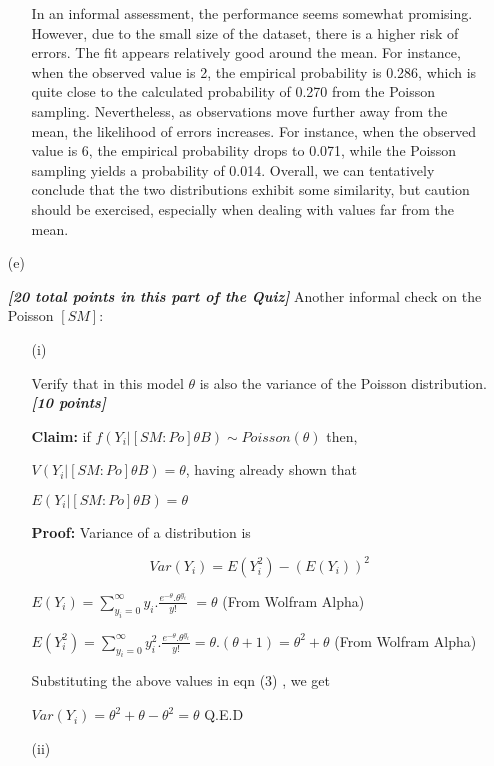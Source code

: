 \documentclass[12pt]{article}
\newcommand{\bi}[1]{\b{\i{#1}}}
\renewcommand{\b}[1]{\textbf{#1}}
\renewcommand{\i}[1]{\textit{#1}}
\begin{document}
\begin{itemize}
\begin{itemize}
{In an informal assessment, the performance seems somewhat promising. However, due to the small size of the dataset, there is a higher risk of errors. The fit appears relatively good around the mean. For instance, when the observed value is 2, the empirical probability is 0.286, which is quite close to the calculated probability of 0.270 from the Poisson sampling. Nevertheless, as observations move further away from the mean, the likelihood of errors increases. For instance, when the observed value is 6, the empirical probability drops to 0.071, while the Poisson sampling yields a probability of 0.014. Overall, we can tentatively conclude that the two distributions exhibit some similarity, but caution should be exercised, especially when dealing with values far from the mean. }
\end{itemize}

\item[(e)]

\bi{[20 total points in this part of the Quiz]} Another informal check on the Poisson $[ SM ]$:

\begin{itemize}

\item[(i)] 

Verify that in this model $\theta$ is also the variance of the Poisson distribution. \bi{[10 points]}
{\color{blue}

\textbf{Claim: } if $f(Y_i | [SM: Po] \theta B) \sim Poisson(\theta)$ then, 

$V(Y_i | [SM: Po] \theta B) = \theta$, having already shown that

$E(Y_i | [SM: Po] \theta B) = \theta$

\textbf{Proof: } Variance of a distribution is 

\begin{equation}
    Var(Y_i) = E(Y_i^2) - (E(Y_i))^2
\end{equation}


$E(Y_i) = \sum_{y_i = 0}^{\infty} y_i . \frac{e^{-\theta}. \theta^{y_i}}{y!}$
$= \theta$ (From Wolfram Alpha)

$E(Y^2_i) = \sum_{y_i = 0}^{\infty} y^2_i . \frac{e^{-\theta}. \theta^{y_i}}{y!} = \theta. (\theta + 1) = \theta^2 + \theta$  (From Wolfram Alpha)

Substituting the above values in eqn (3) , we get

$Var(Y_i) = \theta^2 + \theta - \theta^2 = \theta$
Q.E.D


}
\item[(ii)] 


\end{itemize}
\end{itemize}
\end{document}
